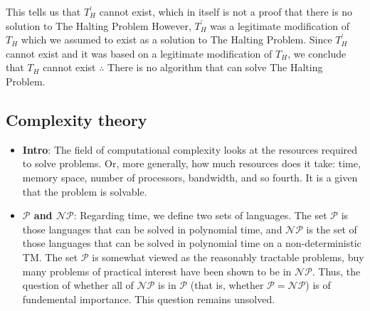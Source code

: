 \documentclass{report}
\begin{document}
\begin{itemize}
            \bigbreak \noindent 
            This tells us that $T_{H}^{\prime}$ cannot exist, which in itself is not a proof that there is no solution to The Halting Problem
            \bigbreak \noindent 
            However, $T_{H}^{\prime}$ was a legitimate modification of $T_{H}$ which we assumed to exist as a solution to The Halting Problem.
            \bigbreak \noindent 
            Since $T_{H}^{\prime}$ cannot exist and it was based on a legitimate modification of $T_{H}$, we conclude that $T_{H}$ cannot exist
            \bigbreak \noindent 
            $\therefore$ There is no algorithm that can solve The Halting Problem.
    \end{itemize}

    \pagebreak 
    \subsection{Complexity theory}
    \begin{itemize}
        \item \textbf{Intro}: The field of computational complexity looks at the resources required to solve problems. Or, more generally, how much resources does it take: time, memory space, number of processors, bandwidth, and so fourth. It is a given that the problem is solvable.
        \item \textbf{$\mathcal{P}$ and $\mathcal{NP}$}: Regarding time, we define two sets of languages. The set $\mathcal{P}$ is those languages that can be solved in polynomial time, and $\mathcal{N}\mathcal{P}$ is the set of those languages that can be solved in polynomial time on a non-deterministic TM. The set $\mathcal{P}$ is somewhat viewed as the reasonably tractable problems, buy many problems of practical interest have been shown to be in $\mathcal{N}\mathcal{P}$. Thus, the question of whether all of $\mathcal{N}\mathcal{P}$ is in $\mathcal{P}$ (that is, whether $\mathcal{P} = \mathcal{N}\mathcal{P}$) is of fundemental importance. This question remains unsolved.
    \end{itemize}
    \bigbreak \noindent 
\end{document}
